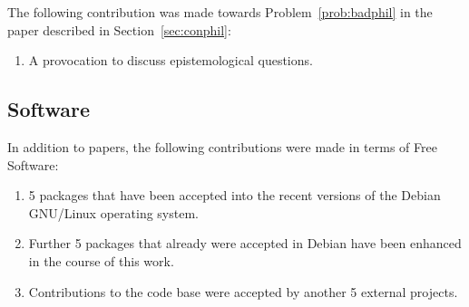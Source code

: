 The following contribution was made towards Problem~\ref{prob:badphil}
in the paper described in Section~\ref{sec:conphil}:

\begin{enumerate}
\item A provocation to discuss epistemological questions.
\end{enumerate}

\subsection{Software}

In addition to papers, the following contributions were made in terms
of Free Software:

\begin{enumerate}
\item 5 packages that have been accepted into the recent
  versions of the Debian GNU/Linux operating system.
\item Further 5 packages that already were accepted in Debian have been
  enhanced in the course of this work.
\item Contributions to the code base were accepted by another 5
  external projects.
\end{enumerate}

